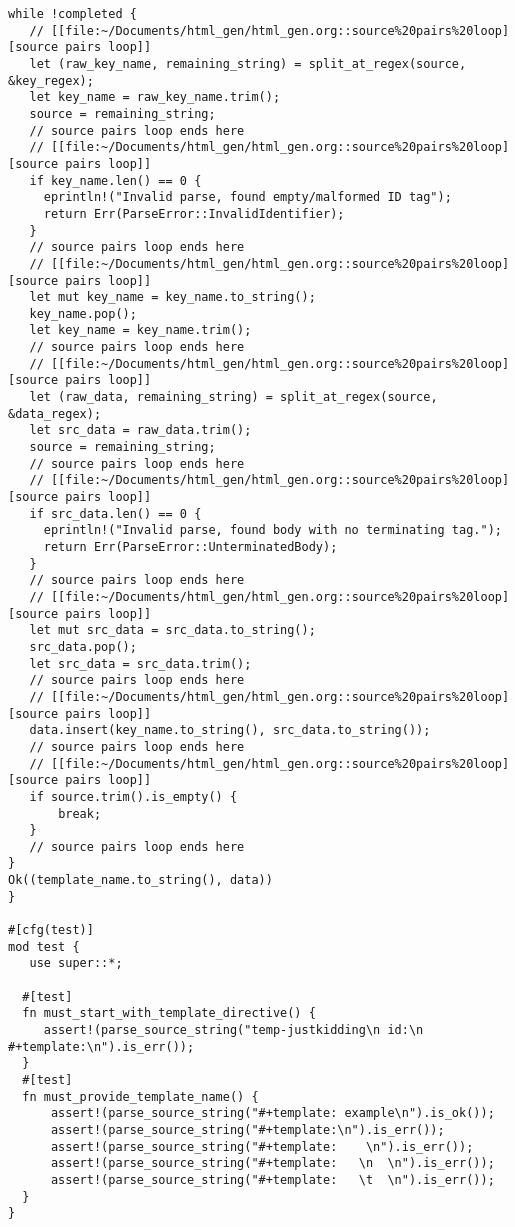 \documentclass[11pt]{article}
\begin{document}
\begin{verbatim}
while !completed {
   // [[file:~/Documents/html_gen/html_gen.org::source%20pairs%20loop][source pairs loop]]
   let (raw_key_name, remaining_string) = split_at_regex(source, &key_regex);
   let key_name = raw_key_name.trim();
   source = remaining_string;
   // source pairs loop ends here
   // [[file:~/Documents/html_gen/html_gen.org::source%20pairs%20loop][source pairs loop]]
   if key_name.len() == 0 {
     eprintln!("Invalid parse, found empty/malformed ID tag");
     return Err(ParseError::InvalidIdentifier);
   }
   // source pairs loop ends here
   // [[file:~/Documents/html_gen/html_gen.org::source%20pairs%20loop][source pairs loop]]
   let mut key_name = key_name.to_string();
   key_name.pop();
   let key_name = key_name.trim();
   // source pairs loop ends here
   // [[file:~/Documents/html_gen/html_gen.org::source%20pairs%20loop][source pairs loop]]
   let (raw_data, remaining_string) = split_at_regex(source, &data_regex);
   let src_data = raw_data.trim();
   source = remaining_string;
   // source pairs loop ends here
   // [[file:~/Documents/html_gen/html_gen.org::source%20pairs%20loop][source pairs loop]]
   if src_data.len() == 0 {
     eprintln!("Invalid parse, found body with no terminating tag.");
     return Err(ParseError::UnterminatedBody);
   }
   // source pairs loop ends here
   // [[file:~/Documents/html_gen/html_gen.org::source%20pairs%20loop][source pairs loop]]
   let mut src_data = src_data.to_string();
   src_data.pop();
   let src_data = src_data.trim();
   // source pairs loop ends here
   // [[file:~/Documents/html_gen/html_gen.org::source%20pairs%20loop][source pairs loop]]
   data.insert(key_name.to_string(), src_data.to_string());
   // source pairs loop ends here
   // [[file:~/Documents/html_gen/html_gen.org::source%20pairs%20loop][source pairs loop]]
   if source.trim().is_empty() {
       break;
   }
   // source pairs loop ends here
}
Ok((template_name.to_string(), data))
}

#[cfg(test)]
mod test {
   use super::*;

  #[test]
  fn must_start_with_template_directive() {
     assert!(parse_source_string("temp-justkidding\n id:\n #+template:\n").is_err());
  }
  #[test]
  fn must_provide_template_name() {
      assert!(parse_source_string("#+template: example\n").is_ok());
      assert!(parse_source_string("#+template:\n").is_err());
      assert!(parse_source_string("#+template:    \n").is_err());
      assert!(parse_source_string("#+template:   \n  \n").is_err());
      assert!(parse_source_string("#+template:   \t  \n").is_err());
  }
}
\end{verbatim}
\end{document}
